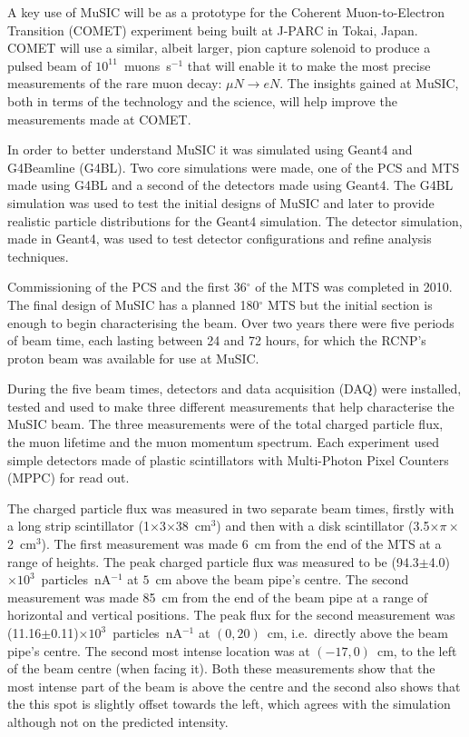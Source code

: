 A key use of MuSIC will be as a prototype for the Coherent Muon-to-Electron Transition (COMET) experiment being built at J-PARC in Tokai, Japan. COMET will use a similar, albeit larger, pion capture solenoid to produce a pulsed beam of \(10^{11}\)~muons~s\(^{-1}\) that will enable it to make the most precise measurements of the rare muon decay: \(\mu N \rightarrow eN\). The insights gained at MuSIC, both in terms of the technology and the science, will help improve the measurements made at COMET. 

In order to better understand MuSIC it was simulated using Geant4 and G4Beamline (G4BL). Two core simulations were made, one of the PCS and MTS made using G4BL and a second of the detectors made using Geant4. The G4BL simulation was used to test the initial designs of MuSIC and later to provide realistic particle distributions for the Geant4 simulation. The detector simulation, made in Geant4, was used to test detector configurations and refine analysis techniques.

Commissioning of the PCS and the first 36\(^{\circ}\) of the MTS was completed in 2010. The final design of MuSIC has a planned 180\(^{\circ}\) MTS but the initial section is enough to begin characterising the beam. Over two years there were five periods of beam time, each lasting between 24 and 72 hours, for which the RCNP's proton beam was available for use at MuSIC. 

During the five beam times, detectors and data acquisition (DAQ) were installed, tested and used to make three different measurements that help characterise the MuSIC beam. The three measurements were of the total charged particle flux, the muon lifetime and the muon momentum spectrum. Each experiment used simple detectors made of plastic scintillators with Multi-Photon Pixel Counters (MPPC) for read out. 

The charged particle flux was measured in two separate beam times, firstly with a long strip scintillator (1\(\times\)3\(\times\)38~cm\(^3\)) and then with a disk scintillator (3.5\(\times \pi \times\)2~cm\(^3\)). The first measurement was made 6~cm from the end of the MTS at a range of heights. The peak charged particle flux was measured to be (94.3\(\pm\)4.0)\(\times10^3\)~particles~nA\(^{-1}\) at \(5\)~cm above the beam pipe's centre. The second measurement was made 85~cm from the end of the beam pipe at a range of horizontal and vertical positions. The peak flux for the second measurement was (11.16\(\pm\)0.11)\(\times10^3\)~particles~nA\(^{-1}\) at \((0, 20)\)~cm, i.e.\ directly above the beam pipe's centre. The second most intense location was at \((-17, 0)\)~cm, to the left of the beam centre (when facing it). Both these measurements show that the most intense part of the beam is above the centre and the second also shows that the this spot is slightly offset towards the left, which agrees with the simulation although not on the predicted intensity.

